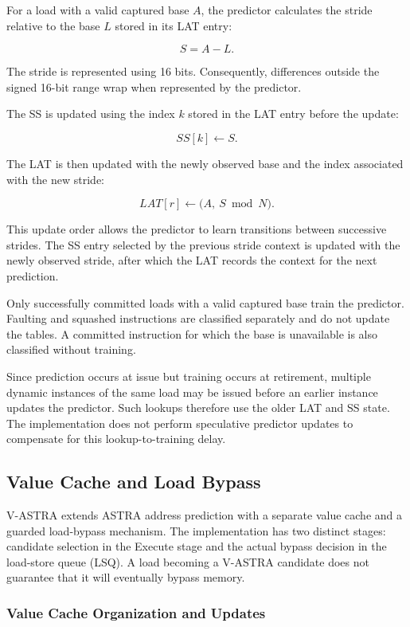 For a load with a valid captured base \(A\), the predictor
calculates the stride relative to the base \(L\) stored in its
LAT entry:

\[
    S = A - L.
\]

The stride is represented using 16 bits. Consequently, differences
outside the signed 16-bit range wrap when represented by the
predictor.

The SS is updated using the index \(k\) stored in the LAT entry
before the update:

\[
    SS[k] \leftarrow S.
\]

The LAT is then updated with the newly observed base and
the index associated with the new stride:

\[
    LAT[r] \leftarrow
    \bigl(A,\ S \bmod N\bigr).
\]

This update order allows the predictor to learn transitions
between successive strides. The SS entry selected by the
previous stride context is updated with the newly observed
stride, after which the LAT records the context for the next
prediction.

Only successfully committed loads with a valid captured base
train the predictor. Faulting and squashed instructions are
classified separately and do not update the tables. A committed
instruction for which the base is unavailable is also classified
without training.

Since prediction occurs at issue but training occurs at retirement,
multiple dynamic instances of the same load may be issued before
an earlier instance updates the predictor. Such lookups therefore
use the older LAT and SS state. The implementation does not
perform speculative predictor updates to compensate for this
lookup-to-training delay.

\subsection{Value Cache and Load Bypass}
\label{sec:impl-vcache}

V-ASTRA extends ASTRA address prediction with a separate value cache and a guarded load-bypass mechanism. The implementation
has two distinct stages: candidate selection in the Execute stage
and the actual bypass decision in the load-store queue (LSQ).
A load becoming a V-ASTRA candidate does not guarantee that it
will eventually bypass memory.

\subsubsection{Value Cache Organization and Updates}

